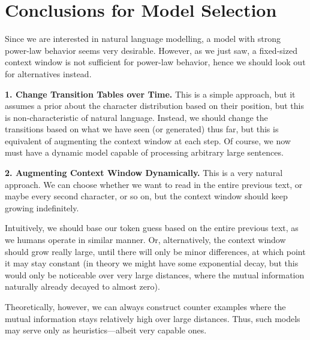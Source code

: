 \documentclass[../../main.tex]{subfiles}
\begin{document}

    \smallskip
\section{Conclusions for Model Selection}
    Since we are interested in natural language modelling, a model with strong power-law behavior seems very desirable. However, as we just saw, a fixed-sized context window is not sufficient for power-law behavior, hence we should look out for alternatives instead.

    \textbf{1. Change Transition Tables over Time.} This is a simple approach, but it assumes a prior about the character distribution based on their position, but this is non-characteristic of natural language. Instead, we should change the transitions based on what we have seen (or generated) thus far, but this is equivalent of augmenting the context window at each step. Of course, we now must have a dynamic model capable of processing arbitrary large sentences.

    \textbf{2. Augmenting Context Window Dynamically.} This is a very natural approach. We can choose whether we want to read in the entire previous text, or maybe every second character, or so on, but the context window should keep growing indefinitely.
    
    Intuitively, we should base our token guess based on the entire previous text, as we humans operate in similar manner. Or, alternatively, the context window should grow really large, until there will only be minor differences, at which point it may stay constant (in theory we might have some exponential decay, but this would only be noticeable over very large distances, where the mutual information naturally already decayed to almost zero).

    Theoretically, however, we can always construct counter examples where the mutual information stays relatively high over large distances. Thus, such models may serve only as heuristics—albeit very capable ones.

\end{document}
